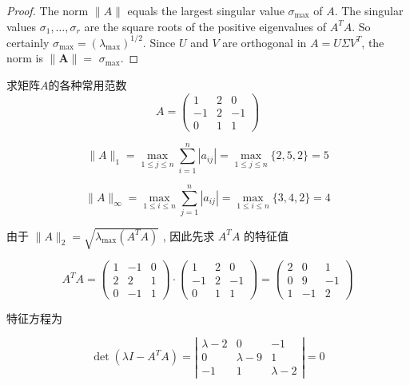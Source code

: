 \begin{proof}
    The norm $\|A\|$ equals the largest singular value $\sigma_{\max }$ of $A$. The singular values $\sigma_{1}, \ldots, \sigma_{r}$ are the square roots of the positive eigenvalues of $A^{{T}} A$. So certainly $\sigma_{\max }=\left(\lambda_{\max }\right)^{1 / 2}$. Since $U$ and $V$ are orthogonal in $A=U \Sigma V^{{T}}$, the norm is $\|\boldsymbol{A}\|=$ $\sigma_{\max }$.
\end{proof}

\begin{example}
    求矩阵$A$的各种常用范数
\begin{equation}
A=\left(\begin{array}{ccc}
1 & 2 & 0 \\
-1 & 2 & -1 \\
0 & 1 & 1
\end{array}\right)
\end{equation}

\begin{equation} \|A\|_{1}=\max _{1 \leq j \leq n} \sum_{i=1}^{n}\left|a_{i j}\right|=\max _{1 \leq j \leq n}\{2,5,2\}=5 \end{equation}

\begin{equation} \|A\|_{\infty}=\max _{1 \leq i \leq n} \sum_{j=1}^{n}\left|a_{i j}\right|=\max _{1 \leq i \leq n}\{3,4,2\}=4 \end{equation}

由于 $ \|A\|_{2}=\sqrt{\lambda_{\max }\left(A^{T} A\right)} $
, 因此先求 $ A^{T} A $ 的特征值

\begin{equation} A^{T} A=\left(\begin{array}{ccc}1 & -1 & 0 \\ 2 & 2 & 1 \\ 0 & -1 & 1\end{array}\right) \cdot\left(\begin{array}{ccc}1 & 2 & 0 \\ -1 & 2 & -1 \\ 0 & 1 & 1\end{array}\right)=\left(\begin{array}{ccc}2 & 0 & 1 \\ 0 & 9 & -1 \\ 1 & -1 & 2\end{array}\right) \end{equation}

特征方程为

\begin{equation} \operatorname{det}\left(\lambda I-A^{T} A\right)=\left|\begin{array}{ccc}\lambda-2 & 0 & -1 \\ 0 & \lambda-9 & 1 \\ -1 & 1 & \lambda-2\end{array}\right|=0 \end{equation}


\end{example}
